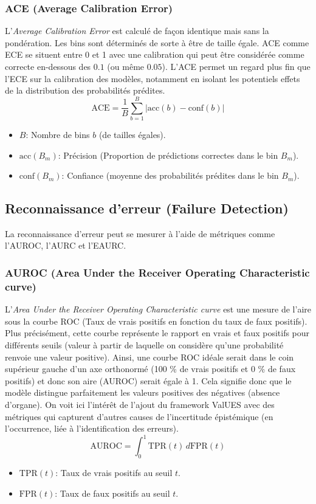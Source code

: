 \documentclass[a4paper,french,bookmarks,12pt]{article}
\begin{document}
    \subsubsection*{ACE (Average Calibration Error)}

    L'\emph{Average Calibration Error} est calculé de façon identique mais sans la pondération. Les bins sont déterminés de sorte à être de taille égale. ACE comme ECE se situent entre 0 et 1 avec une calibration qui peut être considérée comme correcte en-dessous des $0.1$ (ou même $0.05$). L'ACE permet un regard plus fin que l'ECE sur la calibration des modèles, notamment en isolant les potentiels effets de la distribution des probabilités prédites.
    \[ \text{ACE} = \frac{1}{B} \sum_{b=1}^{B} \left| \text{acc}(b) - \text{conf}(b) \right| \]
    \begin{itemize}
        \item \( B \): Nombre de bins \(b\) (de tailles égales).
        \item \( \text{acc}(B_m) \): Précision (Proportion de prédictions correctes dans le bin \( B_m \)).
        \item \( \text{conf}(B_m) \): Confiance (moyenne des probabilités prédites dans le bin \( B_m \)).
    \end{itemize}
    
    \subsection{Reconnaissance d'erreur (Failure Detection)}
    
    La reconnaissance d'erreur peut se mesurer à l'aide de métriques comme l'AUROC, l'AURC et l'EAURC.

    \subsubsection*{AUROC (Area Under the Receiver Operating Characteristic curve)}

    L'\emph{Area Under the Receiver Operating Characteristic curve} est une mesure de l'aire sous la courbe ROC (Taux de vrais positifs en fonction du taux de faux positifs). Plus précisément, cette courbe représente le rapport en vrais et faux positifs pour différents seuils (valeur à partir de laquelle on considère qu'une probabilité renvoie une valeur positive). Ainsi, une courbe ROC idéale serait dans le coin supérieur gauche d'un axe orthonormé (100 \% de vrais positifs et 0 \% de faux positifs) et donc son aire (AUROC) serait égale à 1. Cela signifie donc que le modèle distingue parfaitement les valeurs positives des négatives (absence d'organe). On voit ici l'intérêt de l'ajout du framework ValUES avec des métriques qui capturent d'autres causes de l'incertitude épistémique (en l'occurrence, liée à l'identification des erreurs).
    \[ \text{AUROC} = \int_{0}^{1} \text{TPR}(t) \, d\text{FPR}(t) \]
    \begin{itemize}
        \item \( \text{TPR}(t) \): Taux de vrais positifs au seuil \( t \).
        \item \( \text{FPR}(t) \): Taux de faux positifs au seuil \( t \).
    \end{itemize}
\end{document}
